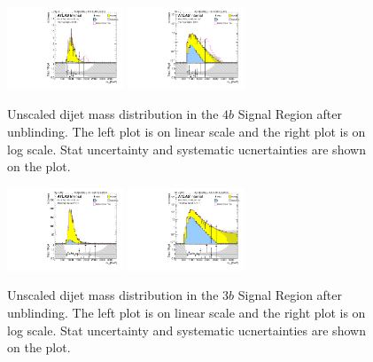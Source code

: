 \begin{figure}[htbp!]
\begin{center}
\includegraphics[width=0.31\textwidth,angle=-90]{figures/boosted/Signal_Syst/Moriond_bkg_9_FourTag_Signal_mHH_l.pdf}
\includegraphics[width=0.31\textwidth,angle=-90]{figures/boosted/Signal_Syst/Moriond_bkg_9_FourTag_Signal_mHH_l_1.pdf}
  \caption{Unscaled dijet mass distribution in the $4b$ Signal Region after unblinding. The left plot is on linear scale and the right plot is on log scale. Stat uncertainty and systematic ucnertainties are shown on the plot.}
  \label{fig:boosted-4b-signal-l}
\end{center}
\end{figure}

\begin{figure}[htbp!]
\begin{center}
\includegraphics[width=0.31\textwidth,angle=-90]{figures/boosted/Signal_Syst/Moriond_bkg_9_ThreeTag_Signal_mHH_l.pdf}
\includegraphics[width=0.31\textwidth,angle=-90]{figures/boosted/Signal_Syst/Moriond_bkg_9_ThreeTag_Signal_mHH_l_1.pdf}  
  \caption{Unscaled dijet mass distribution in the $3b$ Signal Region after unblinding. The left plot is on linear scale and the right plot is on log scale. Stat uncertainty and systematic ucnertainties are shown on the plot.}
  \label{fig:boosted-3b-signal-l}
\end{center}
\end{figure}

